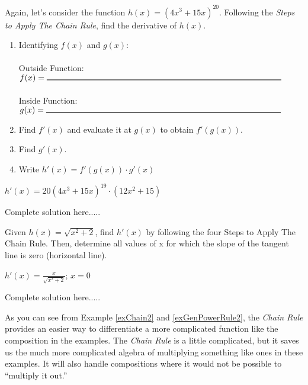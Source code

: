 \begin{example}\label{exChain2}
Again, let's consider the function $h(x)=(4x^3+15x)^{20}$. Following the \emph{Steps to Apply The Chain Rule}, find the derivative of $h(x)$.\\
\begin{enumerate}[leftmargin=*]
    \item Identifying \(f(x)\) and \(g(x)\):\\\\
    Outside Function: $f(x)=\rule{10cm}{0.25mm}$\\\\
    Inside Function: $g(x)=\rule{10cm}{0.25mm}$\\
    \item Find $f'(x)$ and evaluate it at $g(x)$ to obtain $f'(g(x))$.\vspace{0.5in}
    \item Find $g'(x)$.\vspace{0.15in}
    \item Write \(h'(x)=f'(g(x))\cdot g'(x)\)\vspace{0.15in}
\end{enumerate}
    \begin{sol}
    $h'(x)=20(4x^3+15x)^{19}\cdot (12x^2+15)$
    \end{sol}
    \begin{solL}
    Complete solution here.....
    
    \end{solL}
    
\end{example}
\begin{example}\label{exGenPowerRule2}
Given $h(x)=\sqrt{x^2+2}$, find $h'(x)$ by following the four Steps to Apply The Chain Rule. Then, determine all values of x for which the slope of the tangent line is zero (horizontal line).          
    \begin{sol}
    $h'(x)=\displaystyle\frac{x}{\sqrt{x^2+2}}$; $x=0$
    \end{sol}
    \begin{solL}
    Complete solution here.....
    
    \end{solL}
    
\end{example}
\newpage
\noindent As you can see from Example \ref{exChain2} and \ref{exGenPowerRule2}, the \emph{Chain Rule} provides an easier way to differentiate a more complicated function like the composition in the examples. The \emph{Chain Rule} is a little complicated, but it saves us the much more complicated algebra of multiplying something like ones in these examples. It will also handle compositions where it would not be possible to “multiply it out.”
